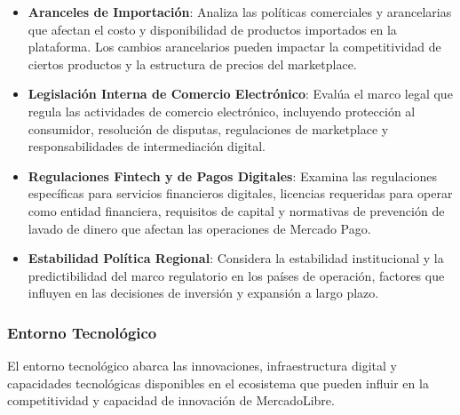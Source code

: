 \begin{itemize}
\item \textbf{Aranceles de Importación}: Analiza las políticas comerciales y arancelarias que afectan el costo y disponibilidad de productos importados en la plataforma. Los cambios arancelarios pueden impactar la competitividad de ciertos productos y la estructura de precios del marketplace.

\item \textbf{Legislación Interna de Comercio Electrónico}: Evalúa el marco legal que regula las actividades de comercio electrónico, incluyendo protección al consumidor, resolución de disputas, regulaciones de marketplace y responsabilidades de intermediación digital.

\item \textbf{Regulaciones Fintech y de Pagos Digitales}: Examina las regulaciones específicas para servicios financieros digitales, licencias requeridas para operar como entidad financiera, requisitos de capital y normativas de prevención de lavado de dinero que afectan las operaciones de Mercado Pago.

\item \textbf{Estabilidad Política Regional}: Considera la estabilidad institucional y la predictibilidad del marco regulatorio en los países de operación, factores que influyen en las decisiones de inversión y expansión a largo plazo.
\end{itemize}

\subsubsection{Entorno Tecnológico}

El entorno tecnológico abarca las innovaciones, infraestructura digital y capacidades tecnológicas disponibles en el ecosistema que pueden influir en la competitividad y capacidad de innovación de MercadoLibre.

